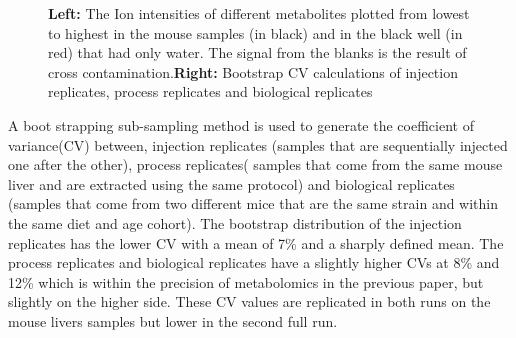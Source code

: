 \documentclass[a4paper]{book}
\begin{document}
\begin{figure}[hbt!]
	\caption{\textbf{Left:} The Ion intensities of different metabolites plotted from lowest to highest in the mouse samples (in black) and in the black well (in red) that had only water. The signal from the blanks is the result of cross contamination.\textbf{Right:} Bootstrap CV calculations of injection replicates, process replicates and biological replicates}
	\label{fig:Total Ion Counts}
\end{figure}
	
A boot strapping sub-sampling method is used to generate the coefficient of variance(CV) between, injection replicates (samples that are sequentially injected one after the other), process replicates( samples that come from the same mouse liver and are extracted using the same protocol) and biological replicates (samples that come from two different mice that are the same strain and within the same diet and age cohort). The bootstrap distribution of the injection replicates has the lower CV with a mean of 7\% and a sharply defined mean. The process replicates and biological replicates have a slightly higher CVs at 8\% and 12\% which is within the precision of metabolomics in the previous paper, but slightly on the higher side. These CV values are replicated in both runs on the mouse livers samples but lower in the second full run.
	
\end{document}
